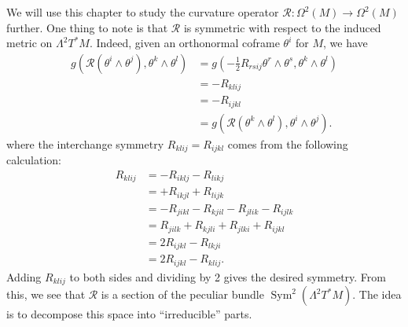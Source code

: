 \documentclass{book}
\newcommand{\scrR}{\mathscr{R}}
\DeclareMathOperator{\Sym}{\mathrm{Sym}}
\theoremstyle{definition}
\numberwithin{equation}{section}
\begin{document}
We will use this chapter to study the curvature operator $\scrR \colon \Omega^2(M) \to \Omega^2(M)$ further. One thing to note is that $\scrR$ is symmetric with respect to the induced metric on $\Lambda^2 T^*M$. Indeed, given an orthonormal coframe $\theta^i$ for $M$, we have 
\begin{equation} \begin{aligned}
    g(\scrR(\theta^i \wedge \theta^j),\theta^k \wedge \theta^l) 
    &= g(- \frac{1}{2} R_{rsij} \theta^r \wedge \theta^s, \theta^k \wedge \theta^l) \\
    &= - R_{klij} \\
    &= - R_{ijkl} \\
    &= g(\scrR(\theta^k \wedge \theta^l),\theta^i \wedge \theta^j).
\end{aligned} \end{equation}
where the interchange symmetry $R_{klij} = R_{ijkl}$ comes from the following calculation:
\begin{equation} \begin{aligned} 
    R_{klij}
    &= - R_{iklj} - R_{likj} \\
    &= + R_{ikjl} + R_{lijk} \\
    &= - R_{jikl} - R_{kjil} - R_{jlik} - R_{ijlk} \\ 
    &= R_{jilk} + R_{kjli} + R_{jlki} + R_{ijkl} \\
    &= 2R_{ijkl} - R_{lkji} \\
    &= 2R_{ijkl} - R_{klij}.
\end{aligned} \end{equation}
Adding $R_{klij}$ to both sides and dividing by 2 gives the desired symmetry. From this, we see that $\scrR$ is a section of the peculiar bundle $\Sym^2(\Lambda^2 T^*M)$. The idea is to decompose this space into ``irreducible'' parts.
\end{document}
